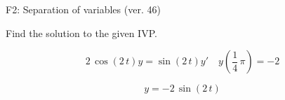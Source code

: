 \begin{exercise}
  \begin{exerciseTitle}F2: Separation of variables (ver. 46)\end{exerciseTitle}
  \begin{exerciseStatement}
    
Find the solution to the given IVP.

    
\[2 \, \cos\left(2 \, t\right) y= \sin\left(2 \, t\right) y'\hspace{1em} y\left( \frac{1}{4} \, \pi \right)= -2\]

  \end{exerciseStatement}
  \begin{exerciseAnswer}
    
\[y= -2 \, \sin\left(2 \, t\right)\]

  \end{exerciseAnswer}
\end{exercise}